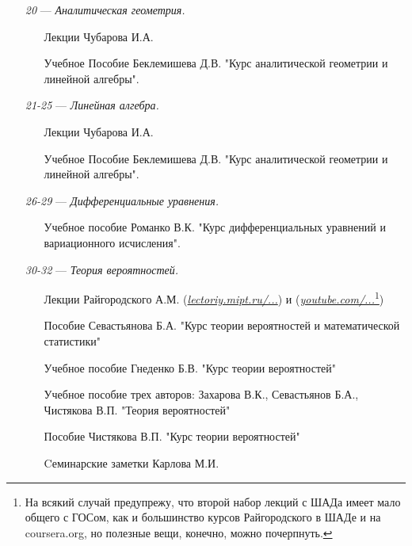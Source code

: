 \begin{itemize}
\item[\textit{20}] 
\; --- \: \textit{Аналитическая геометрия.}
\begin{itemize}
\item[\textbullet]
Лекции Чубарова И.А. 
\item[\textbullet]
Учебное Пособие Беклемишева Д.В. "Курс аналитической геометрии и линейной алгебры".
\end{itemize}

\item[\textit{21-25}] 
\; --- \: \textit{Линейная алгебра.}
\begin{itemize}
\item[\textbullet]
Лекции Чубарова И.А. 
\item[\textbullet]
Учебное Пособие Беклемишева Д.В. "Курс аналитической геометрии и линейной алгебры".
\end{itemize}

\item[\textit{26-29}] 
\; --- \: \textit{Дифференциальные уравнения.}
\begin{itemize}
\item[\textbullet] 
Учебное пособие Романко В.К. "Курс дифференциальных уравнений и вариационного исчисления".
\end{itemize}

\item[\textit{30-32}]
\; --- \: \textit{Теория вероятностей.}
\begin{itemize}
\item[\textbullet]
Лекции Райгородского А.М. (\href{http://lectoriy.mipt.ru/course/Maths-ProbabilityTheoryBasics-L15}{\textit{lectoriy.mipt.ru/...}}) и (\href{https://www.youtube.com/playlist?list=PLJOzdkh8T5kouOIbZDCqzB72hBn9T7gsJ}{\textit{youtube.com/...}\footnote{На всякий случай предупрежу, что второй набор лекций с ШАДа имеет мало общего с ГОСом, как и большинство курсов Райгородского в ШАДе и на coursera.org, но полезные вещи, конечно, можно почерпнуть.}})
\item[\textbullet]
Пособие Севастьянова Б.А. "Курс теории вероятностей и математической статистики"
\item[\textbullet]
Учебное пособие Гнеденко Б.В. "Курс теории вероятностей"
\item [\textbullet]
Учебное пособие трех авторов: Захарова В.К., Севастьянов Б.А., Чистякова В.П. "Теория вероятностей"
\item[\textbullet]
Пособие Чистякова В.П. "Курс теории вероятностей"
\item[\textbullet]
Cеминарские заметки Карлова М.И.
\end{itemize}


\end{itemize}
